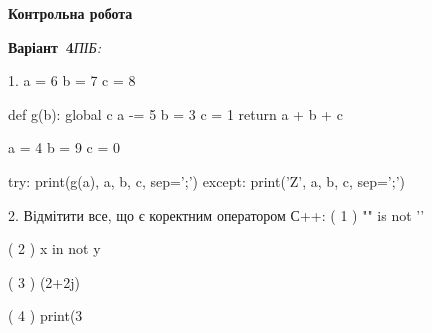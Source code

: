 \documentclass[11pt]{article}
\begin{document}
{\large\textbf{Контрольна робота}}

\textbf{Варіант \No\,4}\hfill \textit{ПІБ:}\,\underline{\hspace{60mm}}
\vspace{4mm}

1. 
a = 6
b = 7
c = 8

def g(b):
global c    a -= 5
    b = 3
    c = 1
    return a + b + c

a = 4
b = 9
c = 0

try:
    print(g(a), a, b, c, sep=';')
except:
    print('Z', a, b, c, sep=';')


2. %
Відмітити все, що є коректним оператором С++:
( 1 ) "\n" is not '\n'

( 2 ) x in not y

( 3 ) (2+2j)%

( 4 ) print(3%


\newpage
\end{document}
